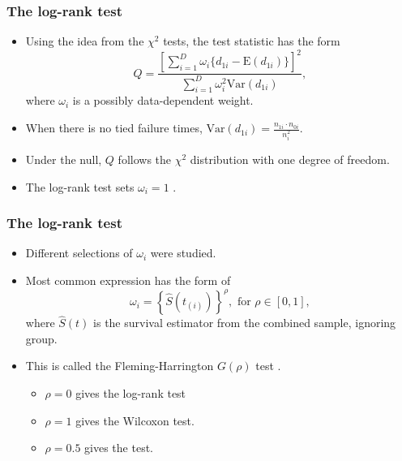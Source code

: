 \documentclass[10pt]{beamer}\usepackage[]{graphicx}\usepackage[]{color}
\newcommand{\Var}{\mathrm{Var}}
\newcommand{\E}{\mathrm{E}}
\begin{document}
\begin{frame}
  \frametitle{The log-rank test}
  \begin{itemize}
  \item Using the idea from the $\chi^2$ tests, the test statistic has the form 
    \begin{equation}
      \label{eq:chi}
      Q = \frac{\left[\sum_{i = 1}^D\omega_i\{d_{1i} - \E(d_{1i})\}\right]^2}{\sum_{i = 1}^D\omega_i^2\Var(d_{1i})},
  \end{equation}
  where $\omega_i$ is a possibly data-dependent weight.
\item When there is no tied failure times, $\Var(d_{1i}) = \frac{n_{1i}\cdot n_{0i}}{n_i^2}$.
\item Under the null, $Q$ follows the $\chi^2$ distribution with one degree of freedom. 
  \item The log-rank test sets $\omega_i = 1$ \citep{peto1972asymptotically}.
  \end{itemize}
\end{frame}    

\begin{frame}
  \frametitle{The log-rank test}
  \begin{itemize}
  \item Different selections of $\omega_i$ were studied. 
  \item Most common expression has the form of
    $$ \omega_i = \left\{\hat{S}(t_{(i)})\right\}^\rho, \mbox{ for }\rho \in [0, 1],$$
    where $\hat{S}(t)$ is the survival estimator from the combined sample, ignoring group.
  \item This is called the Fleming-Harrington $G(\rho)$ test \citep[e.g.][]{cox1984analysis, harrington1982class}.
    \begin{itemize}
    \item $\rho = 0$ gives the log-rank test
    \item $\rho = 1$ gives the Wilcoxon test.
    \item $\rho = 0.5$ gives the \citet{tarone1977distribution} test.
    \end{itemize}
  \end{itemize}
\end{frame}
\end{document}
